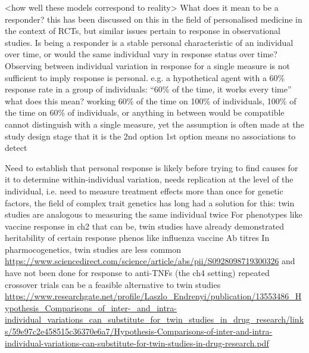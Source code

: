 \begin{outline}
\1 <how well these models correspond to reality>
    \2 What does it mean to be a responder?
    \2 this has been discussed on this in the field of personalised medicine in the context of RCTs, but similar issues pertain to response in observational studies. \autocite{senn2018StatisticalPitfallsPersonalized}
    \2 Is being a responder is a stable personal characteristic of an individual over time, or would the same individual vary in response status over time?
    \2 Observing between individual variation in response for a single measure is not sufficient to imply response is personal.
    \2 e.g. a hypothetical agent with a 60\% response rate in a group of individuals: \enquote{60\% of the time, it works every time}
    \2 what does this mean? working 60\% of the time on 100\% of individuals, 100\% of the time on 60\% of individuals, or anything in between would be compatible
    \2 cannot distinguish with a single measure, yet the assumption is often made at the study design stage that it is the 2nd option
    \2 1st option means no associations to detect

\1 Need to establish that personal response is likely before trying to find causes for it
    \2 to determine within-individual variation, needs replication at the level of the individual, i.e. need to measure treatment effects more than once \autocite{senn2016MasteringVariationVariance}
    \2 for genetic factors, the field of complex trait genetics has long had a solution for this: twin studies are analogous to measuring the same individual twice
    \2 For phenotypes like vaccine response in ch2 that can be, twin studies have already demonstrated heritability of certain response phenos like influenza vaccine Ab titres \autocite{brodin2015VariationHumanImmune}
    \2 In pharmocogenetics, twin studies are less common \url{https://www.sciencedirect.com/science/article/abs/pii/S0928098719300326}
        \3 and have not been done for response to anti-TNFs (the ch4 setting)
    \2 repeated crossover trials can be a feasible alternative to twin studies \url{https://www.researchgate.net/profile/Laszlo_Endrenyi/publication/13553486_Hypothesis_Comparisons_of_inter-_and_intra-individual_variations_can_substitute_for_twin_studies_in_drug_research/links/59e97c2e458515c36370e6a7/Hypothesis-Comparisons-of-inter-and-intra-individual-variations-can-substitute-for-twin-studies-in-drug-research.pdf} \autocite{senn2016MasteringVariationVariance}


\end{outline}
